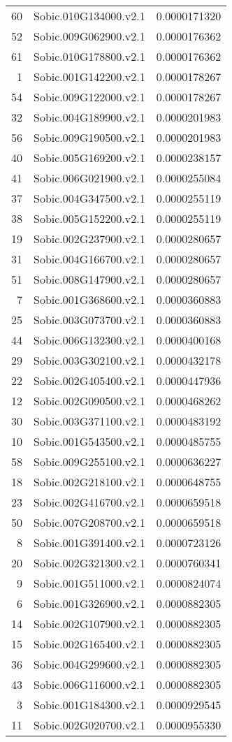 \documentclass[12pt, a4paper]{article}
\begin{document}
\begin{table}[ht]
\begin{tabular}{rlr}
  60 & Sobic.010G134000.v2.1 & 0.0000171320 \\ 
  52 & Sobic.009G062900.v2.1 & 0.0000176362 \\ 
  61 & Sobic.010G178800.v2.1 & 0.0000176362 \\ 
  1 & Sobic.001G142200.v2.1 & 0.0000178267 \\ 
  54 & Sobic.009G122000.v2.1 & 0.0000178267 \\ 
  32 & Sobic.004G189900.v2.1 & 0.0000201983 \\ 
  56 & Sobic.009G190500.v2.1 & 0.0000201983 \\ 
  40 & Sobic.005G169200.v2.1 & 0.0000238157 \\ 
  41 & Sobic.006G021900.v2.1 & 0.0000255084 \\ 
  37 & Sobic.004G347500.v2.1 & 0.0000255119 \\ 
  38 & Sobic.005G152200.v2.1 & 0.0000255119 \\ 
  19 & Sobic.002G237900.v2.1 & 0.0000280657 \\ 
  31 & Sobic.004G166700.v2.1 & 0.0000280657 \\ 
  51 & Sobic.008G147900.v2.1 & 0.0000280657 \\ 
  7 & Sobic.001G368600.v2.1 & 0.0000360883 \\ 
  25 & Sobic.003G073700.v2.1 & 0.0000360883 \\ 
  44 & Sobic.006G132300.v2.1 & 0.0000400168 \\ 
  29 & Sobic.003G302100.v2.1 & 0.0000432178 \\ 
  22 & Sobic.002G405400.v2.1 & 0.0000447936 \\ 
  12 & Sobic.002G090500.v2.1 & 0.0000468262 \\ 
  30 & Sobic.003G371100.v2.1 & 0.0000483192 \\ 
  10 & Sobic.001G543500.v2.1 & 0.0000485755 \\ 
  58 & Sobic.009G255100.v2.1 & 0.0000636227 \\ 
  18 & Sobic.002G218100.v2.1 & 0.0000648755 \\ 
  23 & Sobic.002G416700.v2.1 & 0.0000659518 \\ 
  50 & Sobic.007G208700.v2.1 & 0.0000659518 \\ 
  8 & Sobic.001G391400.v2.1 & 0.0000723126 \\ 
  20 & Sobic.002G321300.v2.1 & 0.0000760341 \\ 
  9 & Sobic.001G511000.v2.1 & 0.0000824074 \\ 
  6 & Sobic.001G326900.v2.1 & 0.0000882305 \\ 
  14 & Sobic.002G107900.v2.1 & 0.0000882305 \\ 
  15 & Sobic.002G165400.v2.1 & 0.0000882305 \\ 
  36 & Sobic.004G299600.v2.1 & 0.0000882305 \\ 
  43 & Sobic.006G116000.v2.1 & 0.0000882305 \\ 
  3 & Sobic.001G184300.v2.1 & 0.0000929545 \\ 
  11 & Sobic.002G020700.v2.1 & 0.0000955330 \\ 
   \hline
\end{tabular}
\end{table}
\clearpage 
\end{document}
